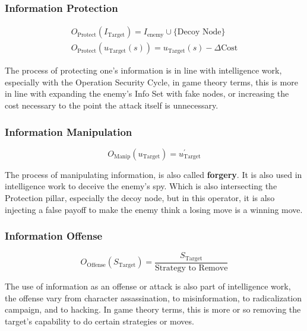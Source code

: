 \documentclass{article}
\begin{document}
\subsubsection{Information Protection}
\begin{align*}
O_{\text{Protect}}(I_{\text{Target}}) = I_{\text{enemy}} \cup \{\text{Decoy Node}\} \\
O_{\text{Protect}}(u_{\text{Target}}(s)) = u_{\text{Target}}(s) - \Delta \text{Cost}
\end{align*}
\begin{small}
The process of protecting one's information is in line with intelligence work, especially with the Operation Security Cycle, in game theory terms, this is more in line with expanding the enemy's Info Set with fake nodes, or increasing the cost necessary to the point the attack itself is unnecessary.
\end{small}

\subsubsection{Information Manipulation}
\[
O_{\text{Manip}}(u_{\text{Target}}) =u^{'}_{\text{Target}}
\]
\begin{small}
The process of manipulating information, is also called \textbf{forgery}. It is also used in intelligence work to deceive the enemy's spy. Which is also intersecting the Protection pillar, especially the decoy node, but in this operator, it is also injecting a false payoff to make the enemy think a losing move is a winning move.
\end{small}

\subsubsection{Information Offense}
\[
O_{\text{Offense}}(S_{\text{Target}}) = \frac{S_{\text{Target}}}{\text{Strategy to Remove}}
\]
\begin{small}
The use of information as an offense or attack is also part of intelligence work, the offense vary from character assassination, to misinformation, to radicalization campaign, and to hacking. In game theory terms, this is more or so removing the target's capability to do certain strategies or moves.
\end{small}
\end{document}

